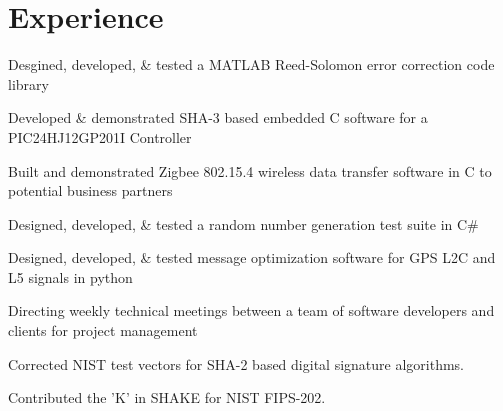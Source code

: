 \documentclass{clinton-resume} %
\begin{document}
\begin{minipage}[t]{0.66\textwidth} %


\section{Experience}


\vspace{\topsep} %
\begin{tightitemize}
\item Desgined, developed, \& tested a MATLAB Reed-Solomon error correction code library
\item Developed \& demonstrated SHA-3 based embedded C software for a PIC24HJ12GP201I Controller
\item Built and demonstrated Zigbee 802.15.4 wireless data transfer software in C to potential business partners
\item Designed, developed, \& tested a random number generation test suite in C\#
\item Designed, developed, \& tested message optimization software for GPS L2C and L5 signals in python
\item Directing weekly technical meetings between a team of software developers and clients for project management
\item Corrected NIST test vectors for SHA-2 based digital signature algorithms.
\item Contributed the 'K' in SHAKE for NIST FIPS-202.


\end{tightitemize}
\end{minipage}
\end{document}
